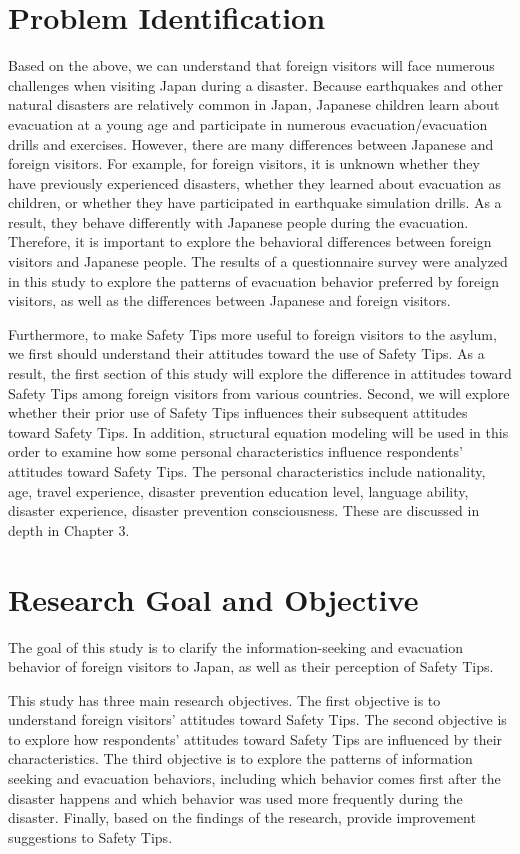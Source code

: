 \section{Problem Identification}
Based on the above, we can understand that foreign visitors will face numerous challenges when visiting Japan during a disaster. Because earthquakes and other natural disasters are relatively common in Japan, Japanese children learn about evacuation at a young age and participate in numerous evacuation/evacuation drills and exercises. However, there are many differences between Japanese and foreign visitors. For example, for foreign visitors, it is unknown whether they have previously experienced disasters, whether they learned about evacuation as children, or whether they have participated in earthquake simulation drills. As a result, they behave differently with Japanese people during the evacuation. Therefore, it is important to explore the behavioral differences between foreign visitors and Japanese people. The results of a questionnaire survey were analyzed in this study to explore the patterns of evacuation behavior preferred by foreign visitors, as well as the differences between Japanese and foreign visitors.

Furthermore, to make Safety Tips more useful to foreign visitors to the asylum, we first should understand their attitudes toward the use of Safety Tips. As a result, the first section of this study will explore the difference in attitudes toward Safety Tips among foreign visitors from various countries. Second, we will explore whether their prior use of Safety Tips influences their subsequent attitudes toward Safety Tips. In addition, structural equation modeling will be used in this order to examine how some personal characteristics influence respondents' attitudes toward Safety Tips. The personal characteristics include nationality, age, travel experience, disaster prevention education level, language ability, disaster experience, disaster prevention consciousness. These are discussed in depth in Chapter 3.

\section{Research Goal and Objective}
The goal of this study is to clarify the information-seeking and evacuation behavior of foreign visitors to Japan, as well as their perception of Safety Tips. 

This study has three main research objectives. The first objective is to understand foreign visitors' attitudes toward Safety Tips. The second objective is to explore how respondents' attitudes toward Safety Tips are influenced by their characteristics. The third objective is to explore the patterns of information seeking and evacuation behaviors, including which behavior comes first after the disaster happens and which behavior was used more frequently during the disaster. Finally, based on the findings of the research, provide improvement suggestions to Safety Tips.


